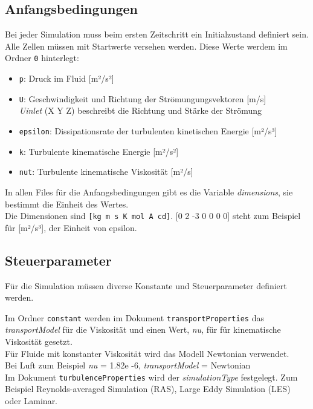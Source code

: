 \subsection{Anfangsbedingungen \label{openfoam:section:Anfangsbedingungen}}
Bei jeder Simulation muss beim ersten Zeitschritt ein Initialzustand definiert sein.
Alle Zellen müssen mit Startwerte versehen werden.
Diese Werte werdem im Ordner \texttt{0} hinterlegt:

\begin{itemize}
    \item \texttt{p}: Druck im Fluid [m²/s²]
    \item \texttt{U}: Geschwindigkeit und Richtung der Strömungungsvektoren [m/s]\\
    \textit{Uinlet} (X Y Z) beschreibt die Richtung und Stärke der Strömung 
    \item \texttt{epsilon}: Dissipationsrate der turbulenten kinetischen Energie [m²/s³]
    \item \texttt{k}: Turbulente kinematische Energie [m²/s²]
    \item \texttt{nut}: Turbulente kinematische Viskosität [m²/s]
\end{itemize}

In allen Files für die Anfangsbedingungen gibt es die Variable \textit{dimensions}, sie bestimmt die Einheit des Wertes.\\
Die Dimensionen sind \texttt{[kg m s K mol A cd]}.
[0 2 -3 0 0 0 0] steht zum Beispiel für [m²/s³], der Einheit von epsilon.

\subsection{Steuerparameter \label{openfoam:section:Steuerparameter}}
Für die Simulation müssen diverse Konstante und Steuerparameter definiert werden.

Im Ordner \texttt{constant} werden im Dokument \texttt{transportProperties} das \textit{transportModel} für die Viskosität und einen Wert, \textit{nu}, für für kinematische Viskosität gesetzt.\\
Für Fluide mit konstanter Viskosität wird das Modell Newtonian verwendet.\\
Bei Luft zum Beispiel \textit{nu} = 1.82e -6, \textit{transportModel} = Newtonian\\

Im Dokument \texttt{turbulenceProperties} wird der \textit{simulationType} festgelegt.
Zum Beispiel Reynolds-averaged Simulation (RAS), Large Eddy Simulation (LES) oder Laminar.\\


